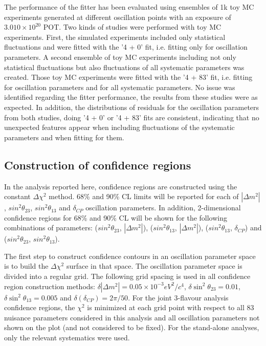 The performance of the fitter has been evaluated using ensembles of 1k toy MC experiments
generated at different oscillation points with an exposure of $3.010\times10^{20}$ POT.
Two kinds of studies were performed with toy MC experiments. First, the simulated experiments
included only statistical fluctuations and were fitted with the '4 + 0' fit, i.e. fitting only for oscillation parameters.
A second ensemble of toy MC experiments including not only statistical fluctuations but also fluctuations of all
systematic parameters was created. Those toy MC experiments were fitted with the '4 + 83' fit, i.e. fitting for 
oscillation parameters and for all systematic parameters. No issue was identified regarding the fitter
performance, the results from these studies were as expected. 
In addition, the distributions of  residuals for the oscillation parameters
from both studies, doing '4 + 0' or '4 + 83' fits are consistent, indicating that no unexpected features 
appear when including fluctuations of the systematic parameters and when fitting for them. 
 
%

\subsection{Construction of confidence regions}

In the analysis reported here, confidence regions are constructed using the constant $\Delta\chi^2$ method.
68\% and 90\% CL limits will be reported for each of $|\Delta m^{2}|$, $sin^{2}\theta_{23}$, $sin^{2}\theta_{13}$ and $\delta_{CP}$
oscillation parameters. In addition, 2-dimensional confidence regions for 68\% and 90\% CL will be shown for the following combinations of parameters: 
($sin^{2}\theta_{23}$, $|\Delta m^{2}|$),
($sin^{2}\theta_{13}$, $|\Delta m^{2}|$),
($sin^{2}\theta_{13}$, $\delta_{CP}$) and
($sin^{2}\theta_{23}$, $sin^{2}\theta_{13}$).

The first step to construct confidence contours in an oscillation parameter space 
is to build the $\Delta\chi^2$ surface in that space.
The oscillation parameter space is divided into a regular grid.
The following grid spacing is used in all confidence region construction methods:
$\delta{|\Delta{m^{2}}|}=0.05\times10^{-3} eV^{2}/c^{4}$,
$\delta{\sin^{2}\theta_{23}}=0.01$,
$\delta{\sin^{2}\theta_{13}}=0.005$ and
$\delta(\delta_{CP})= 2\pi/50$.
For the joint 3-flavour analysis confidence regions,
the $\chi^2$ is minimized at each grid point with respect to all 83 nuisance parameters considered in this analysis
and all oscillation parameters not shown on the plot (and not considered to be fixed).
For the stand-alone analyses, only the relevant systematics were used. 

